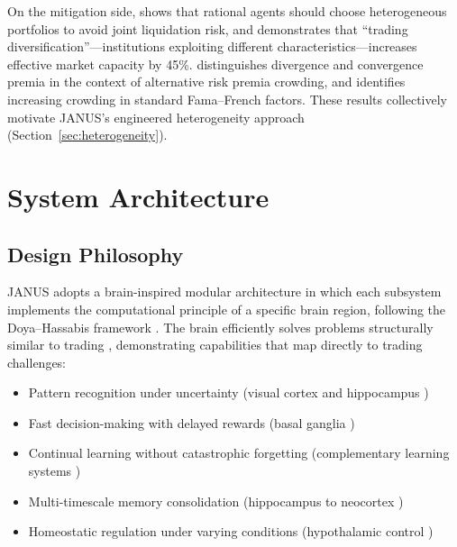 \documentclass[12pt, a4paper]{article}
\begin{document}
On the mitigation side, \citet{wagner2011diversity} shows that rational agents should choose heterogeneous portfolios to avoid joint liquidation risk, and \citet{demiguel2021crowding} demonstrates that ``trading diversification''---institutions exploiting different characteristics---increases effective market capacity by 45\%. \citet{baltas2019arp} distinguishes divergence and convergence premia in the context of alternative risk premia crowding, and \citet{volpati2020zooming} identifies increasing crowding in standard Fama--French factors. These results collectively motivate JANUS's engineered heterogeneity approach (Section~\ref{sec:heterogeneity}).

\section{System Architecture}
\label{sec:architecture}

\subsection{Design Philosophy}
\label{sec:design_philosophy}

JANUS adopts a brain-inspired modular architecture in which each subsystem implements the computational principle of a specific brain region, following the Doya--Hassabis framework \citep{doya1999computations, hassabis2017neuroscience}. The brain efficiently solves problems structurally similar to trading \citep{daw2006cortical}, demonstrating capabilities that map directly to trading challenges:

\begin{itemize}
	\item Pattern recognition under uncertainty (visual cortex and hippocampus \citep{buzsaki2015hippocampal})
	\item Fast decision-making with delayed rewards (basal ganglia \citep{collins2014opponent})
	\item Continual learning without catastrophic forgetting (complementary learning systems \citep{mcclelland1995complementary})
	\item Multi-timescale memory consolidation (hippocampus to neocortex \citep{buzsaki2015hippocampal})
	\item Homeostatic regulation under varying conditions (hypothalamic control \citep{sterling2012allostasis})
\end{itemize}
\end{document}
